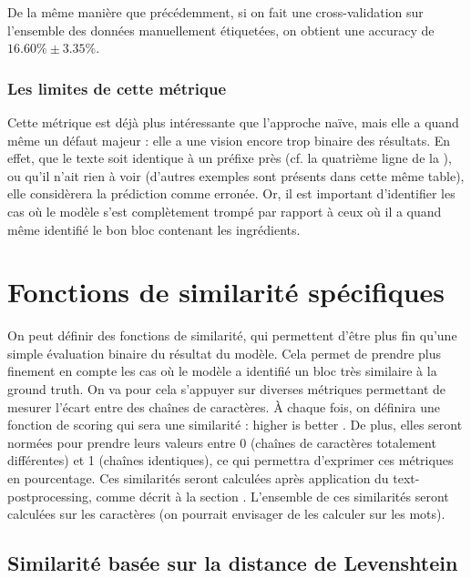                 De la même manière que précédemment, si on fait une cross-validation sur l'ensemble des données manuellement étiquetées, on obtient une accuracy de $16.60\% \pm 3.35\%$.

                \subsubsection{Les limites de cette métrique}

                Cette métrique est déjà plus intéressante que l'approche naïve, mais elle a quand même un défaut majeur : elle a une vision encore trop binaire des résultats.
                En effet, que le texte soit identique à un préfixe près (cf. la quatrième ligne de la ), ou qu'il n'ait rien à voir (d'autres exemples sont présents dans cette même table), elle considèrera la prédiction comme erronée.
                Or, il est important d'identifier les cas où le modèle s'est complètement trompé par rapport à ceux où il a quand même identifié le bon bloc contenant les ingrédients.

        \section{Fonctions de \og similarité \fg spécifiques}

        On peut définir des fonctions de similarité, qui permettent d'être plus fin qu'une simple évaluation binaire du résultat du modèle.
        Cela permet de prendre plus finement en compte les cas où le modèle a identifié un bloc très similaire à la ground truth.
        On va pour cela s'appuyer sur diverses métriques permettant de mesurer l'écart entre des chaînes de caractères.
        \`{A} chaque fois, on définira une fonction de scoring qui sera une similarité : \og higher is better \fg.
        De plus, elles seront normées pour prendre leurs valeurs entre 0 (chaînes de caractères totalement différentes) et 1 (chaînes identiques), ce qui permettra d'exprimer ces métriques en pourcentage.
        Ces similarités seront calculées après application du text-postprocessing, comme décrit à la section .
        L'ensemble de ces similarités seront calculées sur les caractères (on pourrait envisager de les calculer sur les mots).

            \subsection{Similarité basée sur la distance de Levenshtein}

